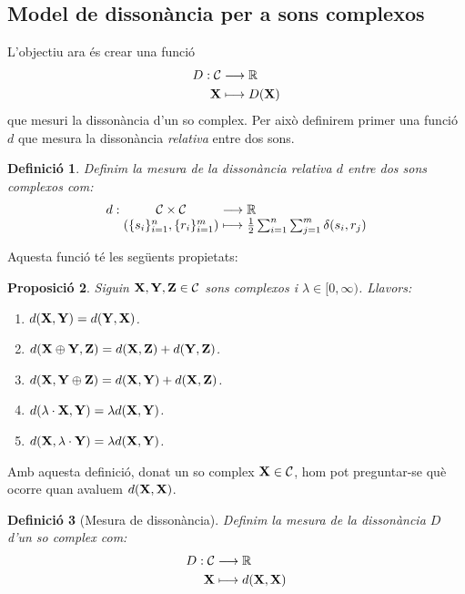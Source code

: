 \documentclass{article}
\theoremstyle{math}
\newtheorem{definition}{Definició}[section]
\newtheorem{prop}[definition]{Proposició}
\theoremstyle{TheoremNum}
\newcommand{\0}{\ensuremath{\vb{0}}}
\newcommand{\X}{\ensuremath{\vb{X}}}
\newcommand{\Y}{\ensuremath{\vb{Y}}}
\newcommand{\Z}{\ensuremath{\vb{Z}}}
\newcommand{\RR}{\ensuremath{\mathbb{R}}} %
\begin{document}
\subsection{Model de dissonància per a sons complexos}
L'objectiu ara és crear una funció 
\begin{align*}
    D:\mathcal{C}&\longrightarrow\RR\\
    \X&\longmapsto D(\X)
\end{align*}
que mesuri la dissonància d'un so complex. Per això definirem primer una funció $d$ que mesura la dissonància \textit{relativa} entre dos sons.
\begin{definition}
    Definim la \textit{mesura de la dissonància relativa $d$} entre dos sons complexos com:
    \begin{equation*}
        \begin{array}{r@{\hspace{0.5\tabcolsep}}c@{\hspace{0.5\tabcolsep}}c@{\hspace{0.5\tabcolsep}}l}
            d:&\mathcal{C}\times\mathcal{C}&\longrightarrow&\RR\\
        &(\{s_i\}_{i=1}^n,\{r_i\}_{i=1}^m)&\longmapsto&\frac{1}{2}\sum_{i=1}^n\sum_{j=1}^m\delta(s_i,r_j)
        \end{array}
    \end{equation*}
\end{definition}
\noindent Aquesta funció té les següents propietats:
\begin{prop}\label{prop_dem1}
    Siguin $\X,\Y,\Z\in\mathcal{C}$ sons complexos i $\lambda\in[0,\infty)$. Llavors:
    \begin{enumerate}[label=$d$\arabic*),ref=$d$\arabic*]
        \item\label{d1} $d(\X,\Y)=d(\Y,\X)$.
        \item\label{d2} $d(\X\oplus\Y,\Z)=d(\X,\Z)+d(\Y,\Z)$.
        \item\label{d3} $d(\X,\Y\oplus\Z)=d(\X,\Y)+d(\X,\Z)$.
        \item\label{d4} $d(\lambda\cdot\X,\Y)=\lambda d(\X,\Y)$.
        \item\label{d5} $d(\X,\lambda\cdot\Y)=\lambda d(\X,\Y)$.
    \end{enumerate}
\end{prop}
\noindent Amb aquesta definició, donat un so complex $\X\in\mathcal{C}$, hom pot preguntar-se què ocorre quan avaluem $d(\X,\X)$.
\begin{definition}[Mesura de dissonància]
    Definim la \textit{mesura de la dissonància $D$ d'un so complex} com:
    \begin{align*}
        D:\mathcal{C}&\longrightarrow\RR\\
        \X&\longmapsto d(\X,\X)
    \end{align*}
\end{definition}
\end{document}

